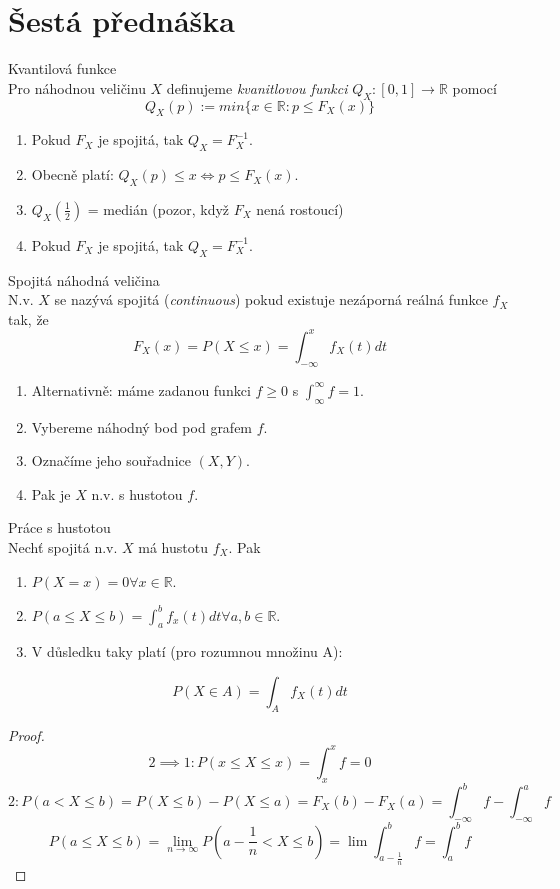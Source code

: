 \documentclass[../main.tex]{subfiles}
\begin{document}
\section{Šestá přednáška}

\begin{definition}
    Kvantilová funkce\\

    Pro náhodnou veličinu $X$ definujeme \textit{kvanitlovou funkci} 
    $Q_X : [0,1] \rightarrow \mathbb{R}$ pomocí
    \[Q_X(p) := min \{x \in \mathbb{R} : p \leq F_X(x)\}\]
    \begin{enumerate}
        \item Pokud $F_X$ je spojitá, tak $Q_X = F^{-1}_X.$
        \item Obecně platí: $Q_X(p) \leq x \Leftrightarrow p \leq F_X(x)$.
        \item $Q_X(\frac{1}{2})$ = medián (pozor, když  $F_X$ nená rostoucí)
        \item Pokud $F_X$ je spojitá, tak $Q_X = F^{-1}_X$.
    \end{enumerate}
\end{definition}
\begin{definition}
    Spojitá náhodná veličina\\

    N.v. $X$ se nazývá spojitá (\textit{continuous}) pokud existuje nezáporná reálná funkce $f_X$ tak, že
    \[F_X(x) = P(X \leq x) = \int^x_{-\infty} f_X(t)dt\]
    \begin{enumerate}
        \item Alternativně: máme zadanou funkci $f \geq 0$ s $\int^\infty_\infty f = 1$.
        \item Vybereme náhodný bod pod grafem $f$.
        \item Označíme jeho souřadnice $(X,Y)$.
        \item Pak je $X$ n.v. s hustotou $f$.
    \end{enumerate}
\end{definition}
\begin{theorem}
    Práce s hustotou\\

    Nechť spojitá n.v. $X$ má hustotu $f_X$. Pak
    \begin{enumerate}
        \item $P(X=x) = 0 \forall x \in \mathbb{R}$.
        \item $P(a\leq X \leq b) = \int^b_a f_x(t) dt \forall a,b \in \mathbb{R}$.
        \item V důsledku taky platí (pro rozumnou množinu A):
    \end{enumerate}
        \[P(X\in A) = \int_A f_X(t) dt\] 
    \begin{proof}
        \[2 \implies 1 : P(x\leq X\leq x) = \int^x_x f = 0\]
        \[2 :  P(a < X \leq b) = P(X\leq b) - P(X\leq a) = F_X(b) - F_X(a) = \int^b_{-\infty} f - \int^a_{-\infty} f\]
        \[P(a\leq X \leq b) = \lim_{n\rightarrow \infty} P(a-\frac{1}{n} < X \leq b) = \lim \int^b_{a-\frac{1}{n}} f = \int^b_a f\]
 
    \end{proof}
    \end{theorem}
\end{document}
